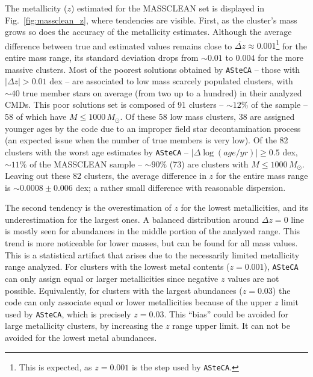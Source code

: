 \documentclass[referee]{aa}
\begin{document}
\begin{appendix}
The metallicity ($z$) estimated for the MASSCLEAN set is displayed in
Fig.~\ref{fig:massclean_z}, where tendencies are visible.
%
First, as the cluster's mass grows so does the accuracy of the
metallicity estimates. Although the average difference between true and
estimated values remains close to $\overline{\Delta z}{\approx}0.001$\footnote
{This is expected, as $z{=}0.001$ is the step used by \texttt{ASteCA}.} for the
entire mass range, its standard deviation drops from ${\sim}0.01$ to $0.004$ for
the more massive clusters.
%
%
Most of the poorest solutions obtained by \texttt{ASteCA} -- those with
$|\Delta z|{>}0.01$ dex -- are associated to low mass scarcely populated
clusters, with ${\sim}40$ true member stars on average (from two up to a
hundred) in their analyzed CMDs. This poor solutions set is composed of 91
clusters -- ${\sim}12\%$ of the sample -- 58 of which have
$M{\le}1000\,M_{\odot}$.
%
Of these 58 low mass clusters, 38 are assigned younger ages by the code due to
an improper field star decontamination process (an expected issue when the
number of true members is very low).
%
Of the 82 clusters with the worst age estimates by \texttt{ASteCA} --
$|\Delta\log(age/yr)|{\ge}0.5$ dex, ${\sim}11\%$ of the MASSCLEAN sample --
${\sim}90\%$ (73) are clusters with $M{\le}1000\,M_{\odot}$.
%
Leaving out these 82 clusters, the average difference in $z$
for the entire mass range is ${\sim}0.0008{\pm}0.006$ dex; a rather
small difference with reasonable dispersion.

The second tendency is the overestimation of $z$ for the lowest metallicities,
and its underestimation for the largest ones.
A balanced distribution around $\Delta z{=}0$ line is mostly seen for
abundances in the middle portion of the analyzed range. This trend is more
noticeable for lower masses, but can be found for all mass values.
%
This is a statistical artifact that arises due to the necessarily limited
metallicity range analyzed. For clusters with the lowest metal contents ($z
{=}0.001$), \texttt{ASteCA} can only assign equal or larger metallicities since
negative $z$ values are not possible.
Equivalently, for clusters with the largest abundances ($z{=}0.03$) the code
can only associate equal or lower metallicities because of the upper
$z$ limit used by \texttt{ASteCA}, which is precisely $z{=}0.03$.
This ``bias'' could be avoided for large metallicity clusters, by
increasing the $z$ range upper limit. It can not be avoided for the lowest metal
abundances.\\


\end{appendix}
\end{document}
